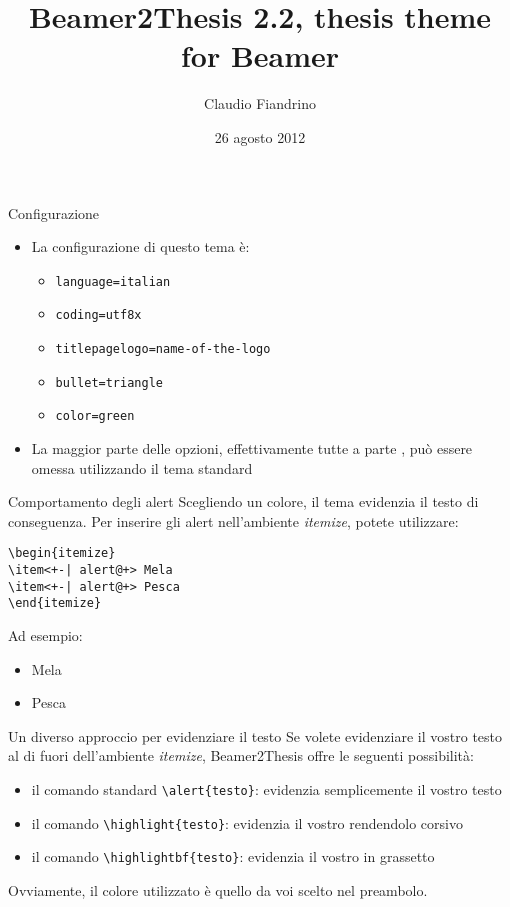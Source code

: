 \documentclass{beamer}
\author{Claudio Fiandrino}
\title{Beamer2Thesis 2.2, thesis theme for Beamer}
\date{26 agosto 2012}
\begin{document}


\begin{frame}[t,fragile]{Configurazione}
\begin{itemize}
\item La configurazione di questo tema è:
\begin{itemize}
\item \verb!language=italian!
\item \verb!coding=utf8x!
\item \verb!titlepagelogo=name-of-the-logo!
\item \verb!bullet=triangle!
\item \verb!color=green!
\end{itemize}
\item La maggior parte delle opzioni, effettivamente tutte a parte , può essere omessa utilizzando il tema standard
\end{itemize}
\end{frame}

\begin{frame}[fragile]{Comportamento degli alert}
Scegliendo un colore, il tema evidenzia il testo di conseguenza. Per inserire gli alert nell'ambiente \emph{itemize}, potete utilizzare:
\begin{verbatim}
\begin{itemize}
\item<+-| alert@+> Mela
\item<+-| alert@+> Pesca
\end{itemize}
\end{verbatim}
Ad esempio:
\begin{itemize}
\item<+-| alert@+> Mela
\item<+-| alert@+> Pesca
\end{itemize}
\end{frame}

\begin{frame}[fragile]{Un diverso approccio per evidenziare il testo}
Se volete evidenziare il vostro testo al di fuori dell'ambiente \emph{itemize}, Beamer2Thesis offre le seguenti possibilità:
\begin{itemize}
\item il comando standard \verb!\alert{testo}!: evidenzia semplicemente il vostro \alert{testo}
\item il comando \verb!\highlight{testo}!: evidenzia il vostro  rendendolo corsivo
\item il comando \verb!\highlightbf{testo}!: evidenzia il vostro  in grassetto
\end{itemize}
Ovviamente, il colore utilizzato è quello da voi scelto nel preambolo.
\end{frame}
\end{document}
